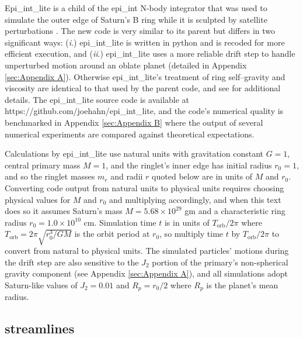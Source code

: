 \documentclass[preprint]{aastex62}
\begin{document}
Epi\_int\_lite is a child of the epi\_int N-body integrator that was used to
simulate the outer edge of Saturn's B ring while it is sculpted by satellite perturbations
\citep{HS13}. The new code is very similar to its parent but differs in two significant ways:
({\it i}.) epi\_int\_lite is written in python and is recoded for more efficient execution, and
({\it ii}.) epi\_int\_lite uses a more reliable drift step to handle
unperturbed motion around an oblate planet (detailed in Appendix \ref{sec:Appendix A}).
Otherwise epi\_int\_lite's treatment of ring self--gravity and viscosity are identical
to that used by the parent code, and see \cite{HS13} for additional details. The epi\_int\_lite 
source code is available at https://github.com/joehahn/epi\_int\_lite, and the
code's numerical quality is benchmarked in Appendix \ref{sec:Appendix B}
where the output of several numerical experiments are compared against theoretical expectations.

Calculations by epi\_int\_lite use natural units with gravitation constant $G=1$, 
central primary mass $M=1$, and the ringlet's inner edge has initial radius
$r_0=1$, and so the ringlet masses $m_r$ and radii $r$ quoted below are in units of $M$ and $r_0$.
Converting code output from natural units to physical units requires choosing	
physical values for $M$ and $r_0$ and multiplying accordingly, and when this text does so
it assumes Saturn's mass $M=5.68\times10^{29}$ gm and a characteristic
ring radius $r_0=1.0\times10^{10}$ cm. Simulation time $t$ is in units of $T_{\text{orb}}/2\pi$
where $T_{\text{orb}} = 2\pi\sqrt{r_0^3/GM}$ is the orbit period at $r_0$, 
so multiply time $t$ by $T_{\text{orb}}/2\pi$ 
to convert from natural to physical units.
The simulated particles' motions during the drift step are also
sensitive to the $J_2$ portion of the primary's non-spherical gravity component 
(see Appendix \ref{sec:Appendix A}), and all simulations
adopt Saturn-like values of $J_2=0.01$ and $R_p=r_0/2$ where $R_p$ is the planet's
mean radius.

\subsection{streamlines}
\label{subsec:streamlines}
\end{document}
